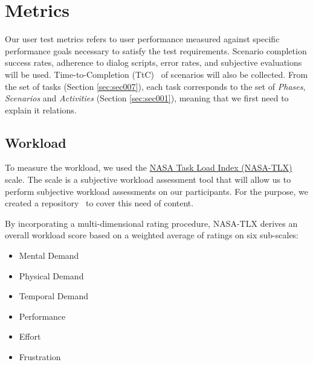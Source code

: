 
\section{Metrics}
\label{sec:sec008}

Our user test metrics refers to user performance measured against specific performance goals necessary to satisfy the test requirements. Scenario completion success rates, adherence to dialog scripts, error rates, and subjective evaluations will be used. Time-to-Completion (TtC)~\cite{ioannidis1998effect} of scenarios will also be collected. From the set of tasks (Section \ref{sec:sec007}), each task corresponds to the set of {\it Phases}, {\it Scenarios} and {\it Activities} (Section \ref{sec:sec001}), meaning that we first need to explain it relations.

\subsection{Workload}

To measure the workload, we used the \hyperlink{https://en.wikipedia.org/wiki/NASA-TLX}{NASA Task Load Index (NASA-TLX)}~\cite{ramkumar2017using} scale. The scale is a subjective workload assessment tool that will allow us to perform subjective workload assessments on our participants. For the purpose, we created a repository~\cite{https://doi.org/10.13140/rg.2.2.25301.06883, francisco_maria_calisto_2018_1435044} to cover this need of content.

\hfill

By incorporating a multi-dimensional rating procedure, NASA-TLX derives an overall workload score based on a weighted average of ratings on six sub-scales:

\begin{itemize}
\item Mental Demand
\item Physical Demand
\item Temporal Demand
\item Performance
\item Effort
\item Frustration 
\end{itemize}


